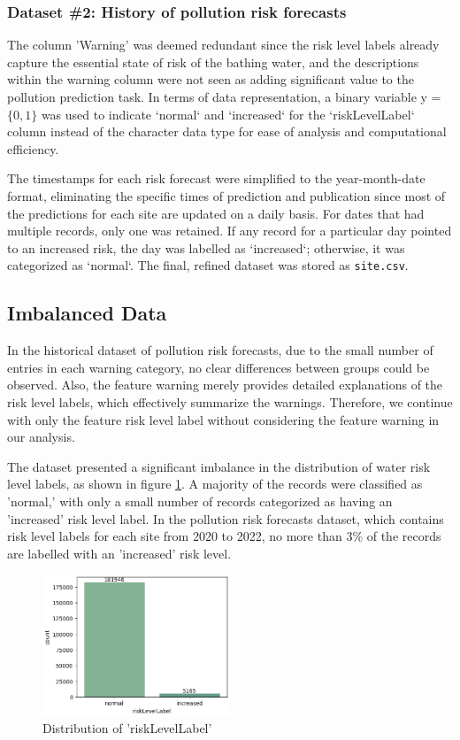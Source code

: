 \documentclass[a4paper,11pt]{report}
\begin{document}
\subsubsection{Dataset \#2: History of pollution risk forecasts}

The column 'Warning' was deemed redundant since the risk level labels already capture the essential state of risk of the bathing water, and the descriptions within the warning column were not seen as adding significant value to the pollution prediction task. In terms of data representation, a binary variable y = $\{0, 1\}$ was used to indicate `normal` and `increased` for the `riskLevelLabel` column instead of the character data type for ease of analysis and computational efficiency.

The timestamps for each risk forecast were simplified to the year-month-date format, eliminating the specific times of prediction and publication since most of the predictions for each site are updated on a daily basis. For dates that had multiple records, only one was retained. If any record for a particular day pointed to an increased risk, the day was labelled as `increased`; otherwise, it was categorized as `normal`. The final, refined dataset was stored as \verb|site.csv|.

\subsection{Imbalanced Data} 

In the historical dataset of pollution risk forecasts, due to the small number of entries in each warning category, no clear differences between groups could be observed. Also, the feature warning merely provides detailed explanations of the risk level labels, which effectively summarize the warnings. Therefore, we continue with only the feature risk level label without considering the feature warning in our analysis.

The dataset presented a significant imbalance in the distribution of water risk level labels, as shown in figure \ref{fig:label}. A majority of the records were classified as 'normal,' with only a small number of records categorized as having an 'increased' risk level label. In the pollution risk forecasts dataset, which contains risk level labels for each site from 2020 to 2022, no more than 3\% of the records are labelled with an 'increased' risk level.


\begin{figure}
\centering
    \includegraphics[width=0.5\textwidth]{images/riskLevelLabel.png}
    \caption{Distribution of 'riskLevelLabel'} 
    \label{fig:label}
\end{figure}
\end{document}
